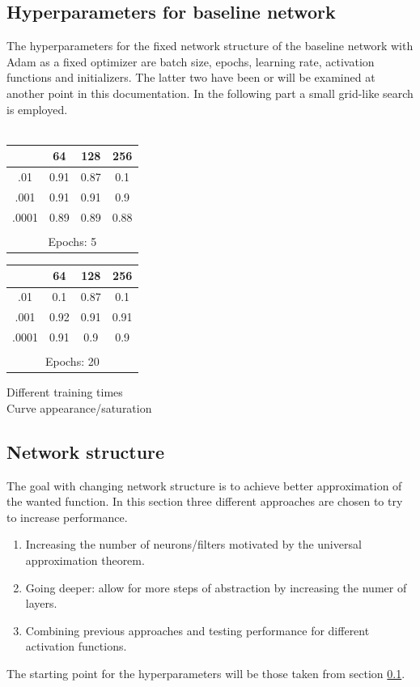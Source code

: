 \documentclass{article}
\begin{document}
\begin{multicols}{2}
\subsection{Hyperparameters for baseline network}
\label{hyperparams}
The hyperparameters for the fixed network structure of the baseline network with Adam as a fixed optimizer are batch size, epochs, learning rate, activation functions and initializers. The latter two have been or will be examined at another point in this documentation. In the following part a small grid-like search is employed.\\
\\
\begin{centering}
	\begin{tabular}{c c c c}
		 & 64 & 128 & 256 \\
		\toprule[2pt]
		.01 & 0.91  & 0.87 & 0.1 \\
		\midrule[0.2pt]
		.001 & 0.91  & 0.91 & 0.9 \\
		\midrule[0.2pt]
		.0001 & 0.89  & 0.89 & 0.88 \\
		\bottomrule[2pt]\\
		\multicolumn{4}{c}{Epochs: 5}
	\end{tabular}
	\hfill
	\begin{tabular}{c c c c}
		& 64 & 128 & 256 \\
		\toprule[2pt]
		.01 & 0.1  & 0.87 & 0.1 \\
		\midrule[0.2pt]
		.001 & 0.92  & 0.91 & 0.91 \\
		\midrule[0.2pt]
		.0001 & 0.91  & 0.9 & 0.9 \\
		\bottomrule[2pt]\\
		\multicolumn{4}{c}{Epochs: 20}
	\end{tabular}
\end{centering}

Different training times\\
Curve appearance/saturation

\subsection{Network structure}
The goal with changing network structure is to achieve better approximation of the wanted function. In this section three different approaches are chosen to try to increase performance. \\
\begin{enumerate}
	\item Increasing the number of neurons/filters motivated by the universal approximation theorem.
	\item Going deeper: allow for more steps of abstraction by increasing the numer of layers.
	\item Combining previous approaches and testing performance for different activation functions.
\end{enumerate}
The starting point for the hyperparameters will be those taken from section \ref{hyperparams}.


\end{multicols}
\end{document}
